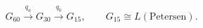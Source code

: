 \setcounter{equation}{2}
\begin{equation}
G_{60}\xrightarrow{q_a}G_{30}\xrightarrow{q_b}G_{15},
\qquad G_{15}\cong L(\text{Petersen}).
\label{eq:tower}
\end{equation}
